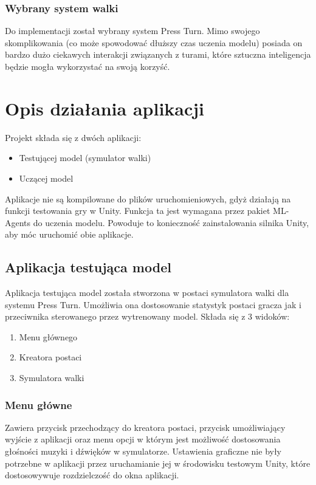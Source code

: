 \documentclass{SGGW-thesis}
\begin{document}
\subsection*{Wybrany system walki}
Do implementacji został wybrany system Press Turn. Mimo swojego skomplikowania (co może spowodować dłuższy czas uczenia modelu) posiada on bardzo dużo ciekawych interakcji związanych z turami, które sztuczna inteligencja będzie mogła wykorzystać na swoją korzyść.

\chapter{Opis działania aplikacji}
Projekt składa się z dwóch aplikacji:
\begin{itemize}
  \item Testującej model (symulator walki)
  \item Uczącej model
\end{itemize}
Aplikacje nie są kompilowane do plików uruchomieniowych, gdyż działają na funkcji testowania gry w Unity.
Funkcja ta jest wymagana przez pakiet ML-Agents do uczenia modelu.
Powoduje to konieczność zainstalowania silnika Unity, aby móc uruchomić obie aplikacje.
\section{Aplikacja testująca model}
Aplikacja testująca model została stworzona w postaci symulatora walki dla systemu Press Turn. Umożliwia ona dostosowanie statystyk postaci gracza jak i przeciwnika sterowanego przez wytrenowany model.
Składa się z 3 widoków:
\begin{enumerate}
  \item Menu głównego
  \item Kreatora postaci
  \item Symulatora walki
\end{enumerate}

\subsection{Menu główne}
Zawiera przycisk przechodzący do kreatora postaci, przycisk umożliwiający wyjście z aplikacji oraz menu opcji w którym jest możliwość dostosowania głośności muzyki i dźwięków w symulatorze.
Ustawienia graficzne nie były potrzebne w aplikacji przez uruchamianie jej w środowisku testowym Unity, które dostosowywuje rozdzielczość do okna aplikacji.
\end{document}
